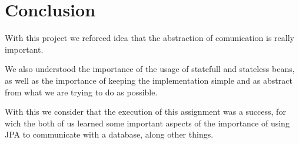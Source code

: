 \documentclass[12pt]{article}
\begin{document}
\section{Conclusion}
\indent \indent With this project we reforced idea that the abstraction of comunication is really important.

We also understood the importance of the usage of statefull and stateless beans, as well as the importance of keeping the implementation simple and as abstract from what we are trying to do as possible.

With this we consider that the execution of this assignment was a success, for wich the both of us learned some important aspects of the importance of using JPA to communicate with a database, along other things.
\clearpage
\end{document}

